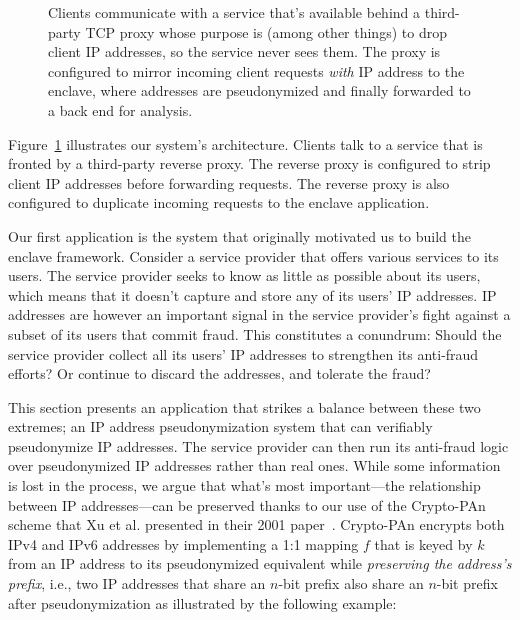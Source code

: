 \begin{figure}[t]
\centering

\caption{Clients communicate with a service that's available behind a
  third-party TCP proxy whose purpose is (among other things) to drop client IP
  addresses, so the service never sees them.  The proxy is configured to mirror
  incoming client requests \emph{with} IP address to the enclave, where
  addresses are pseudonymized and finally forwarded to a back end for analysis.}
\label{fig:address-anonymizer}
\end{figure}

Figure~\ref{fig:address-anonymizer} illustrates our system's architecture.
Clients talk to a service that is fronted by a third-party reverse proxy.  The
reverse proxy is configured to strip client IP addresses before forwarding
requests.  The reverse proxy is also configured to duplicate incoming requests
to the enclave application.


Our first application is the system that originally motivated us to build the
enclave framework. Consider a service provider that offers various services to
its users.  The service provider seeks to know as little as possible about its
users, which means that it doesn't capture and store any of its users' IP
addresses.  IP addresses are however an important signal in the service
provider's fight against a subset of its users that commit fraud.  This
constitutes a conundrum: Should the service provider collect all its users' IP
addresses to strengthen its anti-fraud efforts?  Or continue to discard the
addresses, and tolerate the fraud?

This section presents an application that strikes a balance between these two
extremes; an IP address pseudonymization system that can verifiably pseudonymize
IP addresses.  The service provider can then run its anti-fraud logic over
pseudonymized IP addresses rather than real ones.  While some information is
lost in the process, we argue that what's most important---the relationship
between IP addresses---can be preserved thanks to our use of the Crypto-PAn
scheme that Xu et al. presented in their 2001 paper~\cite{Xu01a}.  Crypto-PAn
encrypts both IPv4 and IPv6 addresses by implementing a 1:1 mapping $f$ that is
keyed by $k$ from an IP address to its pseudonymized equivalent while
\emph{preserving the address's prefix}, i.e., two IP addresses that share an
$n$-bit prefix also share an $n$-bit prefix after pseudonymization as
illustrated by the following example:

